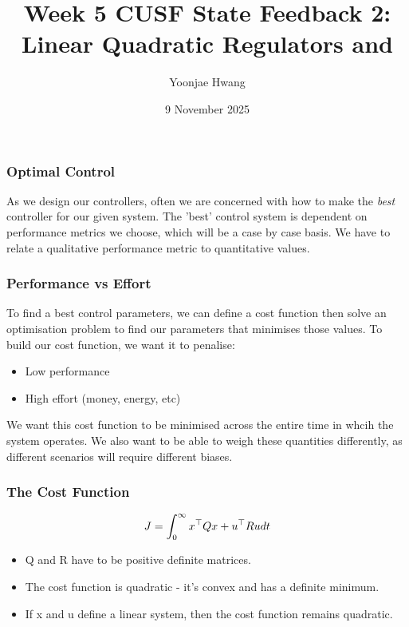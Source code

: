 \documentclass{beamer}
\title{Week 5 CUSF State Feedback 2: Linear Quadratic Regulators and }
\author{Yoonjae Hwang}
\date{9 November 2025}
\theoremstyle{remark}
\begin{document}
\frame{\titlepage}

\begin{frame}
\frametitle{Optimal Control}
As we design our controllers, often we are concerned with how to make the \textsl{best} controller for our given system. 
The 'best' control system is dependent on performance metrics we choose, which will be a case by case basis. 
We have to relate a qualitative performance metric to quantitative values. 

\end{frame}

\begin{frame}
\frametitle{Performance vs Effort}
To find a best control parameters, we can define a cost function then solve an optimisation problem to find our parameters that minimises those values. 
To build our cost function, we want it to penalise: 
\begin{itemize}
    \item Low performance
    \item High effort (money, energy, etc)
\end{itemize} 
We want this cost function to be minimised across the entire time in whcih the system operates. 
We also want to be able to weigh these quantities differently, as different scenarios will require different biases. 
\end{frame}

\begin{frame}
\frametitle{The Cost Function}

\begin{equation}
    J = \int_{0}^{\infty} x^{\top} Q x + u^{\top} R u \space dt
\end{equation}

\begin{itemize}
    \item Q and R have to be positive definite matrices. 
    \item The cost function is quadratic - it's convex and has a definite minimum. 
    \item If x and u define a linear system, then the cost function remains quadratic. 
\end{itemize}
\end{frame}
\end{document}
